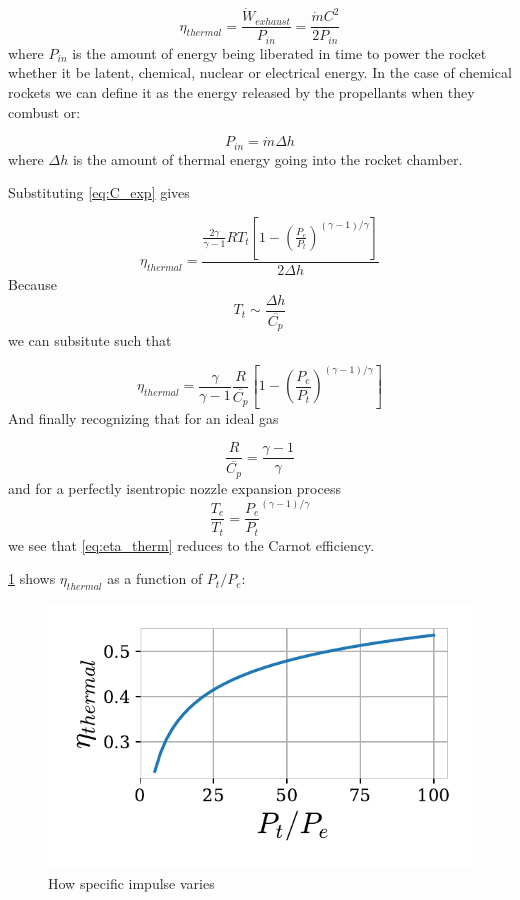\documentclass[twocolumn]{memoir} %
\begin{document}
\[\eta_{thermal} = \frac{\dot{W}_{exhaust}}{P_{in}} = \frac{\dot{m}C^2}{2P_{in}}\]
where \(P_{in}\) is the amount of energy being liberated in time to
power the rocket whether it be latent, chemical, nuclear or electrical energy. In
the case of chemical rockets we can define it as the energy released by
the propellants when they combust or:

\[P_{in} = \dot{m} \Delta h\]
%
where $\Delta h$ is the amount of thermal energy going into the rocket chamber.

Substituting \cref{eq:C_exp} gives

\begin{equation}
    \eta_{thermal} = \frac{\frac{2 \gamma}{\gamma-1}R T_t\left[1 - \left(\frac{P_e}{P_t}\right)^{(\gamma - 1)/\gamma}\right]}{2 \Delta h}
    \label{eq:eta_therm}
\end{equation}
%
Because
%
$$T_t \sim \frac{\Delta h}{\overline{C_p}}$$
%
we can subsitute such that

\begin{equation}
    \eta_{thermal} = \frac{\gamma}{\gamma-1}\frac{R}{\overline{C_p}}\left[1 - \left(\frac{P_e}{P_t}\right)^{(\gamma - 1)/\gamma}\right]
\end{equation}
%
And finally recognizing that for an ideal gas

$$\frac{R}{\overline{C_p}} = \frac{\gamma - 1}{\gamma}$$
%
and for a perfectly isentropic nozzle expansion process
%
$$\frac{T_e}{T_t} = \frac{P_e}{P_t}^{(\gamma - 1)/\gamma}$$
%
we see that \cref{eq:eta_therm} reduces to the Carnot efficiency.

\cref{fig:eta_therm} shows $\eta_{thermal}$ as a function of $P_t/P_e$:

\begin{figure}[h]
    \includegraphics[width=\columnwidth]{eta_therm}
    \caption{How specific impulse varies}
    \label{fig:eta_therm}
\end{figure}
\end{document}
